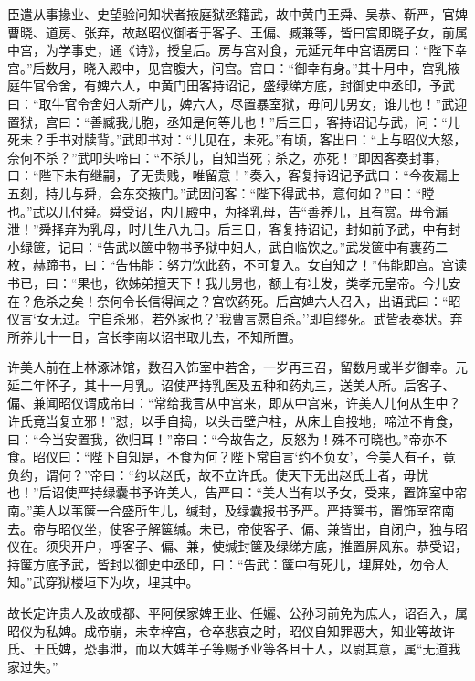 \documentclass[]{article}
\begin{document}
臣遣从事掾业、史望验问知状者掖庭狱丞籍武，故中黄门王舜、吴恭、靳严，官婢曹晓、道房、张弃，故赵昭仪御者于客子、王偏、臧兼等，皆曰宫即晓子女，前属中宫，为学事史，通《诗》，授皇后。房与宫对食，元延元年中宫语房曰：``陛下幸宫。''后数月，晓入殿中，见宫腹大，问宫。宫曰：``御幸有身。''其十月中，宫乳掖庭牛官令舍，有婢六人，中黄门田客持诏记，盛绿绨方底，封御史中丞印，予武曰：``取牛官令舍妇人新产儿，婢六人，尽置暴室狱，毋问儿男女，谁儿也！''武迎置狱，宫曰：``善臧我儿胞，丞知是何等儿也！''后三日，客持诏记与武，问：``儿死未？手书对牍背。''武即书对：``儿见在，未死。''有顷，客出曰：``上与昭仪大怒，奈何不杀？''武叩头啼曰：``不杀儿，自知当死；杀之，亦死！''即因客奏封事，曰：``陛下未有继嗣，子无贵贱，唯留意！''奏入，客复持诏记予武曰：``今夜漏上五刻，持儿与舜，会东交掖门。''武因问客：``陛下得武书，意何如？''曰：``瞠也。''武以儿付舜。舜受诏，内儿殿中，为择乳母，告``善养儿，且有赏。毋令漏泄！''舜择弃为乳母，时儿生八九日。后三日，客复持诏记，封如前予武，中有封小绿箧，记曰：``告武以箧中物书予狱中妇人，武自临饮之。''武发箧中有裹药二枚，赫蹄书，曰：``告伟能：努力饮此药，不可复入。女自知之！''伟能即宫。宫读书已，曰：``果也，欲姊弟擅天下！我儿男也，额上有壮发，类孝元皇帝。今儿安在？危杀之矣！奈何令长信得闻之？宫饮药死。后宫婢六人召入，出语武曰：``昭仪言`女无过。宁自杀邪，若外家也？'我曹言愿自杀。''即自缪死。武皆表奏状。弃所养儿十一日，宫长李南以诏书取儿去，不知所置。

许美人前在上林涿沐馆，数召入饰室中若舍，一岁再三召，留数月或半岁御幸。元延二年怀子，其十一月乳。诏使严持乳医及五种和药丸三，送美人所。后客子、偏、兼闻昭仪谓成帝曰：``常给我言从中宫来，即从中宫来，许美人儿何从生中？许氏竟当复立邪！''怼，以手自捣，以头击壁户柱，从床上自投地，啼泣不肯食，曰：``今当安置我，欲归耳！''帝曰：``今故告之，反怒为！殊不可晓也。''帝亦不食。昭仪曰：``陛下自知是，不食为何？陛下常自言`约不负女'，今美人有子，竟负约，谓何？''帝曰：``约以赵氏，故不立许氏。使天下无出赵氏上者，毋忧也！''后诏使严持绿囊书予许美人，告严曰：``美人当有以予女，受来，置饰室中帘南。''美人以苇箧一合盛所生儿，缄封，及绿囊报书予严。严持箧书，置饰室帘南去。帝与昭仪坐，使客子解箧缄。未已，帝使客子、偏、兼皆出，自闭户，独与昭仪在。须臾开户，呼客子、偏、兼，使缄封箧及绿绨方底，推置屏风东。恭受诏，持箧方底予武，皆封以御史中丞印，曰：``告武：箧中有死儿，埋屏处，勿令人知。''武穿狱楼垣下为坎，埋其中。

故长定许贵人及故成都、平阿侯家婢王业、任孋、公孙习前免为庶人，诏召入，属昭仪为私婢。成帝崩，未幸梓宫，仓卒悲哀之时，昭仪自知罪恶大，知业等故许氏、王氏婢，恐事泄，而以大婢羊子等赐予业等各且十人，以尉其意，属``无道我家过失。''
\end{document}
